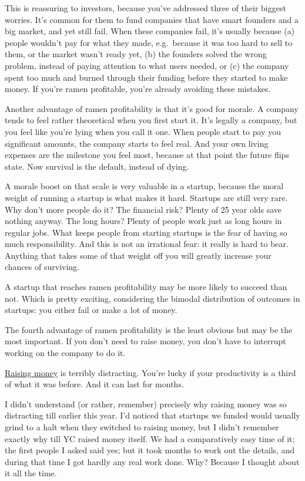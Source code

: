 This is reassuring to investors, because you've addressed three of their
biggest worries. It's common for them to fund companies that have smart
founders and a big market, and yet still fail. When these companies
fail, it's usually because (a) people wouldn't pay for what they made,
e.g.~because it was too hard to sell to them, or the market wasn't ready
yet, (b) the founders solved the wrong problem, instead of paying
attention to what users needed, or (c) the company spent too much and
burned through their funding before they started to make money. If
you're ramen profitable, you're already avoiding these mistakes.

Another advantage of ramen profitability is that it's good for morale. A
company tends to feel rather theoretical when you first start it. It's
legally a company, but you feel like you're lying when you call it one.
When people start to pay you significant amounts, the company starts to
feel real. And your own living expenses are the milestone you feel most,
because at that point the future flips state. Now survival is the
default, instead of dying.

A morale boost on that scale is very valuable in a startup, because the
moral weight of running a startup is what makes it hard. Startups are
still very rare. Why don't more people do it? The financial risk? Plenty
of 25 year olds save nothing anyway. The long hours? Plenty of people
work just as long hours in regular jobs. What keeps people from starting
startups is the fear of having so much responsibility. And this is not
an irrational fear: it really is hard to bear. Anything that takes some
of that weight off you will greatly increase your chances of surviving.

A startup that reaches ramen profitability may be more likely to succeed
than not. Which is pretty exciting, considering the bimodal distribution
of outcomes in startups: you either fail or make a lot of money.

The fourth advantage of ramen profitability is the least obvious but may
be the most important. If you don't need to raise money, you don't have
to interrupt working on the company to do it.

\href{fundraising.html}{Raising money} is terribly distracting. You're
lucky if your productivity is a third of what it was before. And it can
last for months.

I didn't understand (or rather, remember) precisely why raising money
was so distracting till earlier this year. I'd noticed that startups we
funded would usually grind to a halt when they switched to raising
money, but I didn't remember exactly why till YC raised money itself. We
had a comparatively easy time of it; the first people I asked said yes;
but it took months to work out the details, and during that time I got
hardly any real work done. Why? Because I thought about it all the time.

